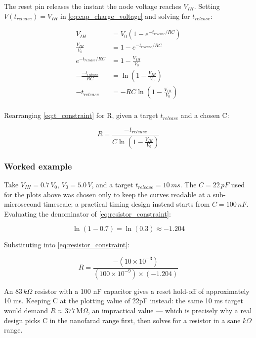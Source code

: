 \documentclass[conference]{IEEEtran}
\begin{document}
The reset pin releases the instant the node voltage reaches $V_{IH}$. Setting $V(t_{release})=V_{IH}$ in \ref{eq:cap_charge_voltage} and solving for $t_{release}$:

\begin{equation}
    \begin{align}
        V_{IH} &= V_0\left(1-e^{-t_{release}/RC}\right)\\
        \frac{V_{IH}}{V_0} &= 1-e^{-t_{release}/RC}\\
        e^{-t_{release}/RC}&= 1-\frac{V_{IH}}{V_0}\\
        -\frac{-t_{release}}{RC}&=\ln\left({1-\frac{V_{IH}}{V_0}}\right)\\
        -t_{release} &= -RC\ln\left({1-\frac{V_{IH}}{V_0}}\right)\\
        \label{eq:t_constraint}
   \end{align}
\end{equation}

\noindent
Rearranging \ref{eq:t_constraint} for R, given a target $t_{release}$ and a chosen C:

\begin{equation}
    R=\frac{-t_{release}}{C\ln\left(1-\frac{V_{IH}}{V_0}\right)}
    \label{eq:resistor_constraint}
\end{equation}

\subsubsection{Worked example}

Take $V_{IH}=0.7\,V_0$, $V_0=5.0\,V$, and a target $t_{release}=10\,ms$. The $C=22\,pF$ used for the plots above was chosen only to keep the curves readable at a sub-microsecond timescale; a practical timing design instead starts from $C=100\,nF$. Evaluating the denominator of \ref{eq:resistor_constraint}:

\begin{equation}
    \ln\left(1-0.7\right)=\ln\left(0.3\right)\approx-1.204
\end{equation}

\noindent
Substituting into \ref{eq:resistor_constraint}:

\begin{equation}
    R=\frac{-(10\times10^{-3})}{(100\times10^{-9})\times(-1.204)}
\end{equation}

\noindent
An $83\,k\Omega$ resistor with a 100 nF capacitor gives a reset hold-off of approximately 10 ms. Keeping C at the plotting value of 22pF instead: the same 10 ms target would demand $R\approx377\,\text{M}\Omega$, an impractical value --- which is precisely why a real design picks C in the nanofarad range first, then solves for a resistor in a sane $k\Omega$ range.
\end{document}
